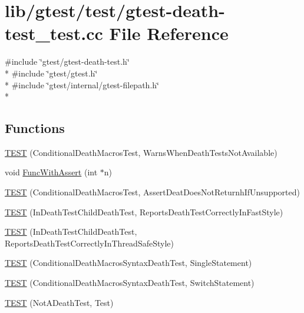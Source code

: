 \hypertarget{gtest-death-test__test_8cc}{\section{lib/gtest/test/gtest-\/death-\/test\-\_\-test.cc File Reference}
\label{gtest-death-test__test_8cc}
}
{\ttfamily \#include \char`\"{}gtest/gtest-\/death-\/test.\-h\char`\"{}}\\*
{\ttfamily \#include \char`\"{}gtest/gtest.\-h\char`\"{}}\\*
{\ttfamily \#include \char`\"{}gtest/internal/gtest-\/filepath.\-h\char`\"{}}\\*
\subsection*{Functions}
\begin{DoxyCompactItemize}
\item 
\hyperlink{gtest-death-test__test_8cc_a8a47cdbd11c2456db464fe098d134aa0}{T\-E\-S\-T} (Conditional\-Death\-Macros\-Test, Warns\-When\-Death\-Tests\-Not\-Available)
\item 
void \hyperlink{gtest-death-test__test_8cc_afe40addf0e0bb4657d18f512092ef03b}{Func\-With\-Assert} (int $\ast$n)
\item 
\hyperlink{gtest-death-test__test_8cc_acdbff3626995270fcbcc0b97e303d742}{T\-E\-S\-T} (Conditional\-Death\-Macros\-Test, Assert\-Deat\-Does\-Not\-Returnh\-If\-Unsupported)
\item 
\hyperlink{gtest-death-test__test_8cc_a46e4e7a2114c1b71021090b40feaae84}{T\-E\-S\-T} (In\-Death\-Test\-Child\-Death\-Test, Reports\-Death\-Test\-Correctly\-In\-Fast\-Style)
\item 
\hyperlink{gtest-death-test__test_8cc_a12fcd5ad260a91ba26a4cc85293bae7a}{T\-E\-S\-T} (In\-Death\-Test\-Child\-Death\-Test, Reports\-Death\-Test\-Correctly\-In\-Thread\-Safe\-Style)
\item 
\hyperlink{gtest-death-test__test_8cc_aacb04a80e0263de84b203b95cc421437}{T\-E\-S\-T} (Conditional\-Death\-Macros\-Syntax\-Death\-Test, Single\-Statement)
\item 
\hyperlink{gtest-death-test__test_8cc_a8d27f7b1efa4db83935274467e17f40c}{T\-E\-S\-T} (Conditional\-Death\-Macros\-Syntax\-Death\-Test, Switch\-Statement)
\item 
\hyperlink{gtest-death-test__test_8cc_af77aa369d8ed7d7ceefda4e7b073b05a}{T\-E\-S\-T} (Not\-A\-Death\-Test, Test)
\end{DoxyCompactItemize}



